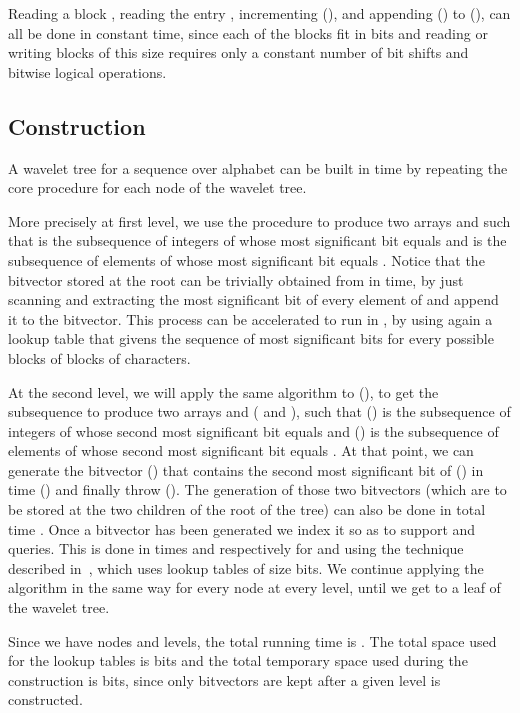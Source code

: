 \documentclass[11pt,runningheads]{llncs}
\begin{document}
{Reading a block , reading the entry , incrementing  (), and appending  () 
to  (), can all be done in constant time, since each of
the blocks  fit in  bits and reading or writing 
blocks of this size requires only a constant number of bit shifts and bitwise logical operations. 

\subsection{Construction}
A wavelet tree for a sequence  over alphabet  can be built 
in time  by repeating the 
core procedure for each node of the wavelet tree. 

More precisely at first level, 
we use the procedure to produce two arrays  and  
such that  is the subsequence of integers of  whose 
most significant bit equals  and  is the subsequence of elements of  whose 
most significant bit equals . Notice that the bitvector stored at the root 
can be trivially obtained from  in  time, by just scanning  and 
extracting the most significant 
bit of every element of  and append it to the bitvector. This process can be accelerated 
to run in , by using again a lookup table that givens the 
sequence of  most significant bits for every possible blocks of 
blocks of characters. 

At the second level, we will apply the same algorithm to 
(), to get the subsequence to produce two arrays  and 
( and ), 
such that () is the subsequence of integers of  whose 
second most significant bit equals  and () is the subsequence of elements of  whose 
second most significant bit equals . At that point, we can generate the bitvector  () 
that contains the second 
most significant bit of  () in time  () and finally throw  (). The generation of those two bitvectors (which are to be stored at the two children of the root of the tree) can also be done in total time . Once a bitvector has been generated 
we index it so as to support  and  queries. This is done in times  and  respectively for  and  using the technique described in~\cite{BGKS15}, which uses lookup tables of size  bits. 
We continue applying the algorithm in the same way for every node at every level, until we get to a leaf of the wavelet tree. 

Since we have  nodes and  levels, the total running time is 
. The total space used for the lookup tables is 
 bits and the total temporary space used during the construction 
is  bits, since only bitvectors are kept after a given level is constructed. 

}
\end{document}
